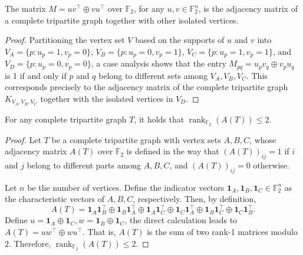 \begin{lemma}\label{lm:triadj}
The matrix $M = u v^\top \oplus v u^\top$ over $\mathbb{F}_2$, for any $u, v \in \mathbb{F}_2^n$, is the adjacency matrix of a complete tripartite graph together with other isolated vertices.
\end{lemma}
\begin{proof}
Partitioning the vertex set $V$ based on the supports of $u$ and $v$ into $V_A = \{p: u_p=1, v_p=0\}$, $V_B = \{p: u_p=0, v_p=1\}$, $V_C = \{p: u_p=1, v_p=1\}$, and $V_D = \{p: u_p=0, v_p=0\}$, a case analysis shows that the entry $M_{pq} = u_p v_q \oplus v_p u_q$ is 1 if and only if $p$ and $q$ belong to different sets among $V_A, V_B, V_C$. This corresponds precisely to the adjacency matrix of the complete tripartite graph $K_{V_A, V_B, V_C}$ together with the isolated vertices in $V_D$.
\end{proof}

\begin{lemma}\label{lm:trirank}
For any complete tripartite graph $T$, it holds that ${\operatorname{rank}_{\mathbb{F}_2}(A(T)) \le 2}$.
\end{lemma}
\begin{proof}
Let $T$ be a complete tripartite graph with vertex sets $A, B, C $, whose adjacency matrix $A(T)$ over $\mathbb{F}_2$ is defined in the way that
 $(A(T))_{ij} = 1$ if $i$ and $j$ belong to different parts among $A, B, C $, and $(A(T))_{ij} = 0$ otherwise.


Let $n$ be the number of vertices. Define the indicator vectors $\mathbf{1}_A, \mathbf{1}_B, \mathbf{1}_C \in \mathbb{F}_2^n$ as the characteristic vectors of $A, B, C$, respectively.
Then, by definition,
\begin{equation}
A(T) = \mathbf{1}_A \mathbf{1}_B^\top \oplus \mathbf{1}_B \mathbf{1}_A^\top \oplus \mathbf{1}_A \mathbf{1}_C^\top \oplus \mathbf{1}_C \mathbf{1}_A^\top \oplus \mathbf{1}_B \mathbf{1}_C^\top \oplus \mathbf{1}_C \mathbf{1}_B^\top.
\end{equation}
Define $u = \mathbf{1}_A \oplus \mathbf{1}_C,  w = \mathbf{1}_B \oplus \mathbf{1}_C$, the direct calculation leads to
$A(T) = u w^\top \oplus w u^\top$. That is, $A(T)$ is the sum of two rank-1 matrices modulo $2$. Therefore,
$\operatorname{rank}_{\mathbb{F}_2}(A(T)) \le 2.$
\end{proof}

